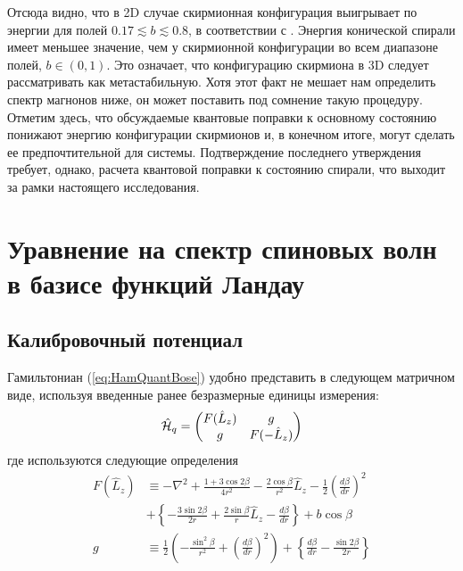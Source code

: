\documentclass[a4paper,article,14pt]{extarticle}
\begin{document}
Отсюда видно, что в 2D случае скирмионная конфигурация выигрывает по энергии для полей  $0.17 \lesssim b \lesssim 0.8$, в соответствии с \cite{Rybakov2015}.
Энергия конической спирали имеет меньшее значение, чем у скирмионной конфигурации во всем диапазоне полей, $b \in (0,1)$. Это означает, что конфигурацию скирмиона в 3D следует рассматривать как метастабильную. Хотя этот факт не мешает нам определить спектр магнонов ниже, он может поставить под сомнение такую процедуру. Отметим здесь, что обсуждаемые квантовые поправки к основному состоянию понижают энергию конфигурации скирмионов и, в конечном итоге, могут сделать ее предпочтительной для системы. Подтверждение последнего утверждения требует, однако, расчета квантовой поправки к состоянию спирали, что выходит за рамки настоящего исследования.


\pagebreak
\section{ Уравнение на спектр спиновых волн в базисе функций Ландау }

\subsection{ Калибровочный потенциал }

Гамильтониан (\ref{eq:HamQuantBose}) удобно представить в следующем матричном виде, используя введенные ранее безразмерные единицы измерения:
\begin{equation}
\label{eq:HamQuantBoseDimensionless}
\hat {\cal H}_{q} =\begin{pmatrix} F(\hat  L_{z}) &g \\ g & F(  - \hat  L_{z} ) \end{pmatrix}
\end{equation}
где используются следующие определения
$$
\begin{aligned} 
F  (\hat  L_{z} )&\equiv   - \nabla^{2}  + \frac{1 + 3\cos 2\beta }{4r^2} - \frac{2\cos \beta }{r^2}\hat{L}_{z} - \frac{1}{2}\left( \frac{d\beta }{dr} \right)^2  \\
& +  \left\{  - \frac{3\sin 2\beta }{2r} + \frac{2\sin \beta }{r}\hat{L}_{z}  - \frac{d\beta }{dr} \right\} + b\cos \beta   \\ 
g &\equiv \frac{1}{2}\left(  - \frac{\sin ^2\beta }{r^2} + \left( \frac{d\beta }{dr} \right)^2 \right) 
+ \left\{ \frac{d\beta }{dr} - \frac{\sin 2\beta }{2r} \right\}
\end{aligned}  
$$
\end{document}

